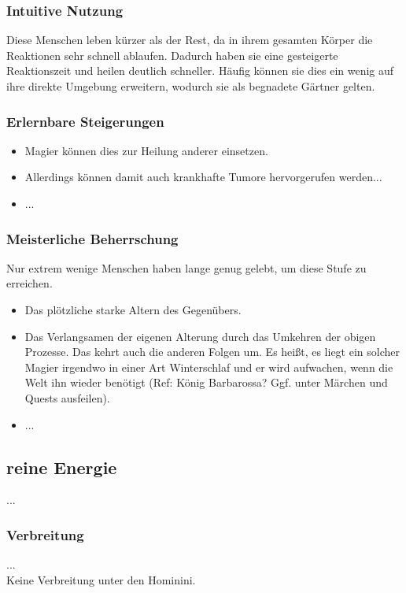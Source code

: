 \subsubsection{Intuitive Nutzung}
Diese Menschen leben kürzer als der Rest, da in ihrem gesamten Körper die Reaktionen sehr schnell ablaufen. Dadurch haben sie eine gesteigerte Reaktionszeit und heilen deutlich schneller. Häufig können sie dies ein wenig auf ihre direkte Umgebung erweitern, wodurch sie als begnadete Gärtner gelten.

\subsubsection{Erlernbare Steigerungen}
\begin{itemize}
	\item Magier können dies zur Heilung anderer einsetzen.
	\item Allerdings können damit auch krankhafte Tumore hervorgerufen werden... 
	\item ...
\end{itemize}

\subsubsection{Meisterliche Beherrschung} 
Nur extrem wenige Menschen haben lange genug gelebt, um diese Stufe zu erreichen.
\begin{itemize}
	\item Das plötzliche starke Altern des Gegenübers.
	\item Das Verlangsamen der eigenen Alterung durch das Umkehren der obigen Prozesse. Das kehrt auch die anderen Folgen um. Es heißt, es liegt ein solcher Magier irgendwo in einer Art Winterschlaf und er wird aufwachen, wenn die Welt ihn wieder benötigt (Ref: König Barbarossa? Ggf. unter Märchen und Quests ausfeilen). %
	\item ...
\end{itemize}



\subsection{reine Energie}\label{sec:energiemagie}
...

\subsubsection{Verbreitung}
...\\
Keine Verbreitung unter den Hominini.

